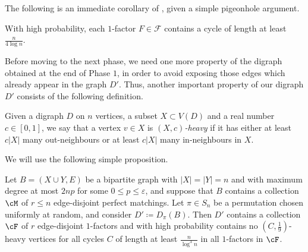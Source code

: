 \documentclass{article}
\begin{document}
	The following is an immediate corollary of , given a simple pigeonhole argument.
	\begin{corollary}
		\label{lem:longcycle}
		With high probability, each $1$-factor $F\in \mathcal F$ contains a cycle of length at least $\frac{n}{4\log n}$.
	\end{corollary}

	Before moving to the next phase, we need one more property of the digraph obtained at the end of Phase $1$, in order to avoid exposing those edges which already appear in the graph $D'$.
	Thus, another important property of our digraph $D'$ consists of the following definition.
	\begin{definition}
		\label{def:heavyvtx}
		Given a digraph $D$ on $n$ vertices, a subset $X \subset V(D)$ and a real number $c \in [0,1]$, we say that a vertex $v \in X$ is \emph{$(X,c)$-heavy} if it has either at least $c|X|$ many out-neighbours or at least $c|X|$ many in-neighbours in $X$.
	\end{definition}
	We will use the following simple proposition.
    \begin{proposition}
	\label{prop:heavyvtx}
		Let $B = (X \cup Y, E)$ be a bipartite graph with $|X| = |Y| = n$ and with maximum degree at most $2np$ for some $0 \le p \le \varepsilon$, and suppose that $B$ contains a collection $\cM$ of $r \le n$ edge-disjoint perfect matchings.
		Let $\pi \in S_n$ be a permutation chosen uniformly at random, and consider $D' \coloneqq D_{\pi}(B)$.
		Then $D'$ contains a collection $\cF$ of $r$ edge-disjoint $1$-factors and with high probability contains no $\left(C, \frac{1}{9} \right)$-heavy vertices for all cycles $C$ of length at least $\frac{n}{\log^3 n}$ in all $1$-factors in $\cF$.
	\end{proposition}
\end{document}

